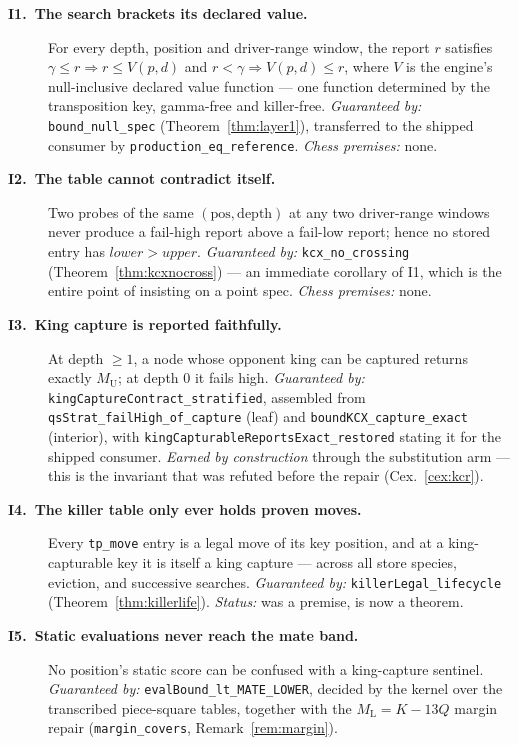 \documentclass[11pt]{article}
\newcommand{\MU}{M_{\mathrm{U}}}    %
\newcommand{\ML}{M_{\mathrm{L}}}    %
\theoremstyle{plain}
\theoremstyle{definition}
\theoremstyle{remark}
\begin{document}
\begin{description}
  \item[\textnormal{\textbf{I1.\ The search brackets its declared
    value.}}]  For every depth, position and driver-range window, the
    report $r$ satisfies $\gamma \le r \Rightarrow r \le V(p,d)$ and
    $r < \gamma \Rightarrow V(p,d) \le r$, where $V$ is the engine's
    null-inclusive declared value function --- one function determined
    by the transposition key, gamma-free and killer-free.
    \emph{Guaranteed by:} \texttt{bound\_null\_spec}
    (Theorem~\ref{thm:layer1}), transferred to the shipped consumer by
    \texttt{production\_eq\_reference}.  \emph{Chess premises:} none.

  \item[\textnormal{\textbf{I2.\ The table cannot contradict
    itself.}}]  Two probes of the same $(\mathrm{pos},\mathrm{depth})$
    at any two driver-range windows never produce a fail-high report
    above a fail-low report; hence no stored entry has
    $\mathit{lower} > \mathit{upper}$.
    \emph{Guaranteed by:} \texttt{kcx\_no\_crossing}
    (Theorem~\ref{thm:kcxnocross}) --- an immediate corollary of I1,
    which is the entire point of insisting on a point spec.
    \emph{Chess premises:} none.

  \item[\textnormal{\textbf{I3.\ King capture is reported
    faithfully.}}]  At depth $\ge 1$, a node whose opponent king can be
    captured returns exactly $\MU$; at depth 0 it fails high.
    \emph{Guaranteed by:} \texttt{kingCaptureContract\_stratified},
    assembled from \texttt{qsStrat\_failHigh\_of\_capture} (leaf) and
    \texttt{boundKCX\_capture\_exact} (interior), with
    \texttt{kingCapturableReportsExact\_restored} stating it for the
    shipped consumer.  \emph{Earned by construction} through the
    substitution arm --- this is the invariant that was refuted before
    the repair (Cex.~\ref{cex:kcr}).

  \item[\textnormal{\textbf{I4.\ The killer table only ever holds
    proven moves.}}]  Every \texttt{tp\_move} entry is a legal move of
    its key position, and at a king-capturable key it is itself a king
    capture --- across all store species, eviction, and successive
    searches.
    \emph{Guaranteed by:} \texttt{killerLegal\_lifecycle}
    (Theorem~\ref{thm:killerlife}).  \emph{Status:} was a premise, is
    now a theorem.

  \item[\textnormal{\textbf{I5.\ Static evaluations never reach the
    mate band.}}]  No position's static score can be confused with a
    king-capture sentinel.
    \emph{Guaranteed by:} \texttt{evalBound\_lt\_MATE\_LOWER}, decided
    by the kernel over the transcribed piece-square tables, together
    with the $\ML = K - 13Q$ margin repair (\texttt{margin\_covers},
    Remark~\ref{rem:margin}).


\end{description}
\end{document}
